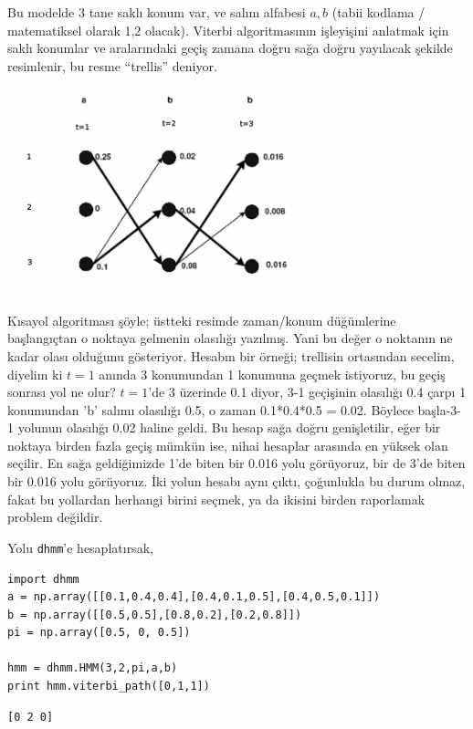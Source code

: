 \documentclass[12pt,fleqn]{article}\usepackage{../../common}
\begin{document}
Bu modelde 3 tane saklı konum var, ve salım alfabesi $a,b$ (tabii kodlama /
matematiksel olarak 1,2 olacak). Viterbi algoritmasının işleyişini anlatmak
için saklı konumlar ve aralarındaki geçiş zamana doğru sağa doğru yayılacak
şekilde resimlenir, bu resme ``trellis'' deniyor.

\includegraphics[height=6cm]{tser_hmm_08.png}

Kısayol algoritması şöyle; üstteki resimde zaman/konum düğümlerine
başlangıçtan o noktaya gelmenin olasılığı yazılmış. Yani bu değer o
noktanın ne kadar olası olduğunu gösteriyor. Hesabın bir örneği; trellisin
ortasından secelim, diyelim ki $t=1$ anında 3 konumundan 1 konumuna geçmek
istiyoruz, bu geçiş sonrası yol ne olur?  $t=1$'de 3 üzerinde 0.1 diyor,
3-1 geçişinin olasılığı 0.4 çarpı 1 konumundan 'b' salımı olasılığı 0.5, o
zaman 0.1*0.4*0.5 = 0.02. Böylece başla-3-1 yolunun olasılığı 0.02 haline
geldi. Bu hesap sağa doğru genişletilir, eğer bir noktaya birden fazla
geçiş mümkün ise, nihai hesaplar arasında en yüksek olan seçilir. En sağa
geldiğimizde 1'de biten bir 0.016 yolu görüyoruz, bir de 3'de biten bir
0.016 yolu görüyoruz. İki yolun hesabı aynı çıktı, çoğunlukla bu durum
olmaz, fakat bu yollardan herhangi birini seçmek, ya da ikisini birden
raporlamak problem değildir.

Yolu \verb!dhmm!'e hesaplatırsak,

\begin{verbatim}
import dhmm
a = np.array([[0.1,0.4,0.4],[0.4,0.1,0.5],[0.4,0.5,0.1]])
b = np.array([[0.5,0.5],[0.8,0.2],[0.2,0.8]])
pi = np.array([0.5, 0, 0.5])

hmm = dhmm.HMM(3,2,pi,a,b)
print hmm.viterbi_path([0,1,1])
\end{verbatim}

\begin{verbatim}
[0 2 0]
\end{verbatim}
\end{document}
